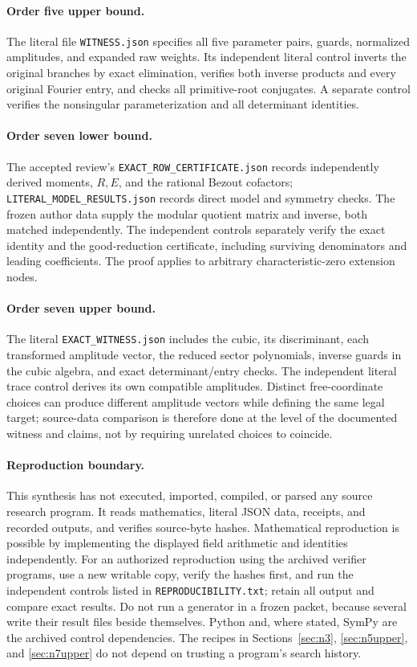 \documentclass[11pt,letterpaper]{article}
\theoremstyle{definition}\newtheorem{definition}[theorem]{Definition}
\begin{document}
\paragraph{Order five upper bound.}
The literal file \texttt{WITNESS.json} specifies all five parameter pairs, guards, normalized amplitudes, and expanded raw weights. Its independent literal control inverts the original branches by exact elimination, verifies both inverse products and every original Fourier entry, and checks all primitive-root conjugates. A separate control verifies the nonsingular parameterization and all determinant identities.

\paragraph{Order seven lower bound.}
The accepted review's \nolinkurl{EXACT_ROW_CERTIFICATE.json} records independently derived moments, $R,E$, and the rational Bezout cofactors; \nolinkurl{LITERAL_MODEL_RESULTS.json} records direct model and symmetry checks. The frozen author data supply the modular quotient matrix and inverse, both matched independently. The independent controls separately verify the exact identity and the good-reduction certificate, including surviving denominators and leading coefficients. The proof applies to arbitrary characteristic-zero extension nodes.

\paragraph{Order seven upper bound.}
The literal \texttt{EXACT\_WITNESS.json} includes the cubic, its discriminant, each transformed amplitude vector, the reduced sector polynomials, inverse guards in the cubic algebra, and exact determinant/entry checks. The independent literal trace control derives its own compatible amplitudes. Distinct free-coordinate choices can produce different amplitude vectors while defining the same legal target; source-data comparison is therefore done at the level of the documented witness and claims, not by requiring unrelated choices to coincide.

\paragraph{Reproduction boundary.}
This synthesis has not executed, imported, compiled, or parsed any source research program. It reads mathematics, literal JSON data, receipts, and recorded outputs, and verifies source-byte hashes. Mathematical reproduction is possible by implementing the displayed field arithmetic and identities independently. For an authorized reproduction using the archived verifier programs, use a new writable copy, verify the hashes first, and run the independent controls listed in \texttt{REPRODUCIBILITY.txt}; retain all output and compare exact results. Do not run a generator in a frozen packet, because several write their result files beside themselves. Python and, where stated, SymPy are the archived control dependencies. The recipes in Sections~\ref{sec:n3}, \ref{sec:n5upper}, and \ref{sec:n7upper} do not depend on trusting a program's search history.
\end{document}
